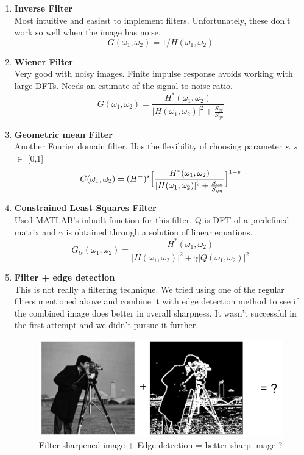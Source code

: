 \begin{enumerate}
\item {\bf Inverse Filter}\\
Most intuitive and easiest to implement filters. Unfortunately, these don't work so well when the image has noise.
\begin{equation}
G(\omega_1,\omega_2) = 1/H(\omega_1,\omega_2)
\end{equation}

\item {\bf Wiener Filter}\\
Very good with noisy images. Finite impulse response avoids working with large DFTs. Needs an estimate of the signal to noise ratio.
\begin{equation}
G(\omega_1,\omega_2) = \frac{H^*(\omega_1,\omega_2)}{|H(\omega_1,\omega_2)|^2 + \frac{S_{vv}}{S_{\eta\eta}}}
\end{equation}

\item {\bf Geometric mean Filter}\\
Another Fourier domain filter. Has the flexibility of choosing parameter {\sl s}. {\sl s} $\in$ [0,1]
\begin{equation}
G(\omega_1,\omega_2) = (H^-)^s\Bigl[\frac{H^*(\omega_1,\omega_2)}{|H(\omega_1,\omega_2)|^2 + \frac{S_{vv}}{S_{\eta\eta}}}\Bigr]^{1-s}
\end{equation}

\item {\bf Constrained Least Squares Filter}\\
Used MATLAB's inbuilt function for this filter. Q is DFT of a predefined matrix and $\gamma$ is obtained through a solution of linear equations.
\begin{equation}
G_{ls}(\omega_1,\omega_2) = \frac{H^*(\omega_1,\omega_2)}{|H(\omega_1,\omega_2)|^2 + \gamma|Q(\omega_1,\omega_2)|^2}
\end{equation}

\item {\bf Filter + edge detection}\\
This is not really a filtering technique. We tried using one of the regular filters mentioned above and combine it with edge detection method to see if the combined image does better in overall sharpness. It wasn't successful in the first attempt and we didn't pursue it further. 
\begin{figure}[H]
\centering
\includegraphics[scale=.6]{ED}
\caption{Filter sharpened image + Edge detection = better sharp image ?}
\end{figure}

\end{enumerate}
\newpage